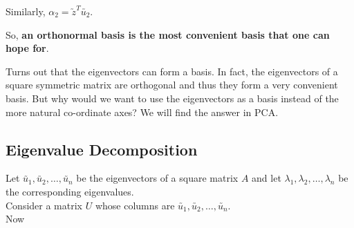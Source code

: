 \documentclass[11pt, a4paper]{article}
\begin{document}
Similarly, $\alpha_2 = \utilde{z}^T \utilde{u_2}$. \\

\vspace{0.3cm}

So, \textbf{an orthonormal basis is the most convenient basis that one can hope for}. \\

\vspace{0.3cm}

\leftpointright \hspace{0.3cm} Turns out that the eigenvectors can form a basis. In fact, the eigenvectors of a square symmetric matrix are orthogonal and thus they form a very convenient basis. But why would we want to use the eigenvectors as a basis instead of the more natural co-ordinate axes? We will find the answer in PCA. \\

\subsection{Eigenvalue Decomposition}

Let $\utilde{u_1}, \utilde{u_2}, \ldots, \utilde{u_n}$ be the eigenvectors of a square matrix $A$ and let $\lambda_1, \lambda_2, \ldots, \lambda_n$ be the corresponding eigenvalues. \\[1.5em]

Consider a matrix $U$ whose columns are $\utilde{u_1}, \utilde{u_2}, \ldots, \utilde{u_n}$. \\[1.5em]

Now
\end{document}
